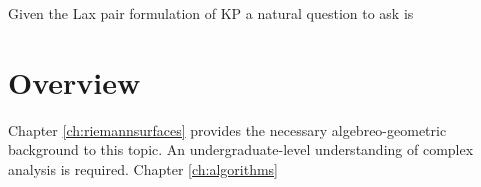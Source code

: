 Given the Lax pair formulation of KP a natural question to ask is

\section{Overview}

Chapter \ref{ch:riemannsurfaces} provides the necessary algebreo-geometric
background to this topic. An undergraduate-level understanding of complex
analysis is required. Chapter \ref{ch:algorithms} 
